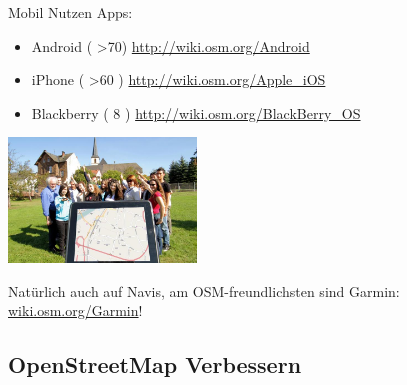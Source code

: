 \documentclass{beamer}
\begin{document}
\begin{frame}{Mobil Nutzen}
	Apps:
 
 \begin{itemize}
   \item  Android ( \textgreater 70) \url{http://wiki.osm.org/Android}
   \item  iPhone ( \textgreater 60 )  \url{http://wiki.osm.org/Apple\_iOS}
   \item  Blackberry ( 8 ) \url{http://wiki.osm.org/BlackBerry\_OS}
 \end{itemize}
 
 \begin{center}
 \includegraphics[width=5cm]{tablet.jpg}
 \end{center}

 Natürlich auch auf Navis, am OSM-freundlichsten sind Garmin: \href{http://wiki.osm.org/Garmin}{wiki.osm.org/Garmin}!

\end{frame}

  \subsection{ OpenStreetMap Verbessern}
\end{document}

